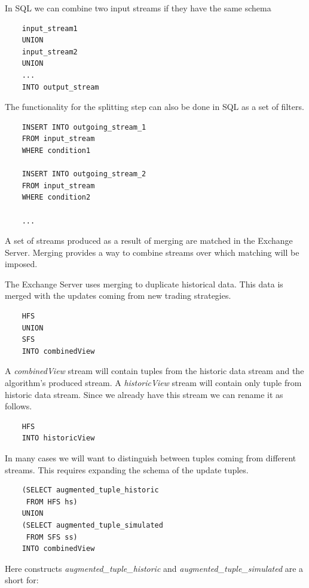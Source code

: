 \documentclass{article}
\begin{document}
\noindent In SQL we can combine two input streams if they have the same schema 

\begin{verbatim}   
    input_stream1
    UNION
    input_stream2
    UNION
    ...
    INTO output_stream
\end{verbatim}

\noindent The functionality for the splitting step can also be done in SQL as a set of filters. 

\begin{verbatim}   
    INSERT INTO outgoing_stream_1 
    FROM input_stream
    WHERE condition1
    
    INSERT INTO outgoing_stream_2
    FROM input_stream
    WHERE condition2
    
    ...
\end{verbatim}


A set of streams produced as a result of merging are matched in the Exchange Server. Merging provides a way to combine streams over which matching will be imposed. 

The Exchange Server uses merging to duplicate historical data. This data is merged with the updates coming from new trading strategies.

\begin{verbatim}  
    HFS
    UNION
    SFS
    INTO combinedView
\end{verbatim}

\noindent A \emph{combinedView} stream will contain tuples from the historic data stream and the algorithm's produced stream. A \emph{historicView} stream will contain only tuple from historic data stream. Since we already have this stream we can rename it as follows.

\begin{verbatim}  
    HFS
    INTO historicView
\end{verbatim}


In many cases we will want to distinguish between tuples coming from different streams. This requires expanding the schema of the update tuples. 

\begin{verbatim}  
    (SELECT augmented_tuple_historic
     FROM HFS hs)
    UNION
    (SELECT augmented_tuple_simulated
     FROM SFS ss)
    INTO combinedView
\end{verbatim}

Here constructs \emph{augmented\_tuple\_historic} and \emph{augmented\_tuple\_simulated} are a short for:
\end{document}
